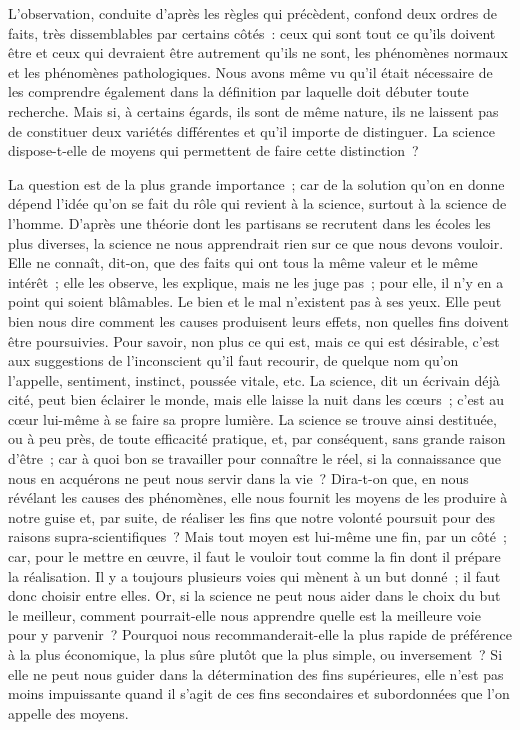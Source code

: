 \documentclass[french,twoside]{book} %
\newcommand\chaptercont{} %
\begin{document}
\chaptercont
\noindent L’observation, conduite d’après les règles qui précèdent, confond deux ordres de faits, très dissemblables par certains côtés : ceux qui sont tout ce qu’ils doivent être et ceux qui devraient être autrement qu’ils ne sont, les phénomènes normaux et les phénomènes pathologiques. Nous avons même vu qu’il était nécessaire de les comprendre également dans la définition par laquelle doit débuter toute recherche. Mais si, à certains égards, ils sont de même nature, ils ne laissent pas de constituer deux variétés différentes et qu’il importe de distinguer. La science dispose-t-elle de moyens qui permettent de faire cette distinction ?\par
La question est de la plus grande importance ; car de la solution qu’on en donne dépend l’idée qu’on se fait du rôle qui revient à la science, surtout à la science de l’homme. D’après une théorie dont les partisans se recrutent dans les écoles les plus diverses, la science ne nous apprendrait rien sur ce que nous devons vouloir. Elle ne connaît, dit-on, que des faits qui ont tous la même valeur et le même intérêt ; elle les observe, les explique, mais ne les juge pas ; pour elle, il n’y en a point qui soient blâmables. Le bien et le mal n’existent pas à ses yeux. Elle peut bien nous dire comment les causes produisent leurs effets, non quelles fins doivent être poursuivies. Pour savoir, non plus ce qui est, mais ce qui est désirable, c’est aux suggestions de l’inconscient qu’il faut recourir, de quelque nom qu’on l’appelle, sentiment, instinct, poussée vitale, etc. La science, dit un écrivain déjà cité, peut bien éclairer le monde, mais elle laisse la nuit dans les cœurs ; c’est au cœur lui-même à se faire sa propre lumière. La science se trouve ainsi destituée, ou à peu près, de toute efficacité pratique, et, par conséquent, sans grande raison d’être ; car à quoi bon se travailler pour connaître le réel, si la connaissance que nous en acquérons ne peut nous servir dans la vie ? Dira-t-on que, en nous révélant les causes des phénomènes, elle nous fournit les moyens de les produire à notre guise et, par suite, de réaliser les fins que notre volonté poursuit pour des raisons supra-scientifiques ? Mais tout moyen est lui-même une fin, par un côté ; car, pour le mettre en œuvre, il faut le vouloir tout comme la fin dont il prépare la réalisation. Il y a toujours plusieurs voies qui mènent à un but donné ; il faut donc choisir entre elles. Or, si la science ne peut nous aider dans le choix du but le meilleur, comment pourrait-elle nous apprendre quelle est la meilleure voie pour y parvenir ? Pourquoi nous recommanderait-elle la plus rapide de préférence à la plus économique, la plus sûre plutôt que la plus simple, ou inversement ? Si elle ne peut nous guider dans la détermination des fins supérieures, elle n’est pas moins impuissante quand il s’agit de ces fins secondaires et subordonnées que l’on appelle des moyens.\par
\end{document}
